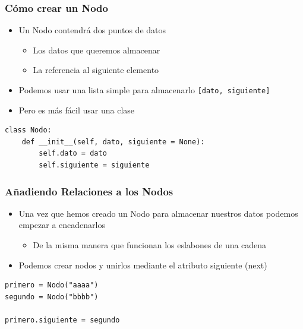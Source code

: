 \documentclass[11pt]{beamer}
\begin{document}
	\begin{frame}[fragile]
		\frametitle{Cómo crear un Nodo}
		\begin{itemize}
			\item Un Nodo contendrá dos puntos de datos
			\begin{itemize}
				\item Los datos que queremos almacenar
				\item La referencia al siguiente elemento
			\end{itemize}
			\item Podemos usar una lista simple para almacenarlo \lstinline|[dato, siguiente]|
			\item Pero es más fácil usar una clase
		\end{itemize}
\pause
\begin{lstlisting}
class Nodo:
	def __init__(self, dato, siguiente = None):
		self.dato = dato
		self.siguiente = siguiente
\end{lstlisting}
	\end{frame}

	\begin{frame}[fragile]
		\frametitle{Añadiendo Relaciones a los Nodos}
		\begin{itemize}
			\item Una vez que hemos creado un Nodo para almacenar nuestros datos podemos empezar a encadenarlos
			\begin{itemize}
				\item De la misma manera que funcionan los eslabones de una cadena
			\end{itemize}
			\item Podemos crear nodos y unirlos mediante el atributo siguiente (next)
		\end{itemize}
		\vspace{0.5cm}
  		\begin{center}
  		\end{center}
        \vspace{0.2cm}
        \pause
\begin{lstlisting}
primero = Nodo("aaaa")
segundo = Nodo("bbbb")

primero.siguiente = segundo
\end{lstlisting}
		
	\end{frame}
\end{document}
